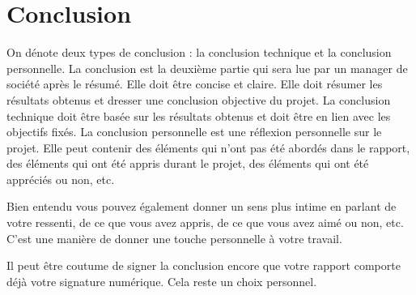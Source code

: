 \chapter{Conclusion}

On dénote deux types de conclusion : la conclusion technique et la conclusion personnelle. La conclusion est la deuxième partie qui sera lue par un manager de société après le résumé. Elle doit être concise et claire. Elle doit résumer les résultats obtenus et dresser une conclusion objective du projet. La conclusion technique doit être basée sur les résultats obtenus et doit être en lien avec les objectifs fixés. La conclusion personnelle est une réflexion personnelle sur le projet. Elle peut contenir des éléments qui n'ont pas été abordés dans le rapport, des éléments qui ont été appris durant le projet, des éléments qui ont été appréciés ou non, etc.

Bien entendu vous pouvez également donner un sens plus intime en parlant de votre ressenti, de ce que vous avez appris, de ce que vous avez aimé ou non, etc. C'est une manière de donner une touche personnelle à votre travail.

Il peut être coutume de signer la conclusion encore que votre rapport comporte déjà votre signature numérique. Cela reste un choix personnel.

\vfil
\hspace{8cm}\makeatletter\@author\makeatother\par
\hspace{8cm}\begin{minipage}{5cm}
    \printsignature
\end{minipage}